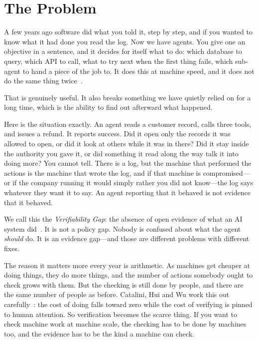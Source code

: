 \documentclass[11pt]{article}
\begin{document}
\clearpage

\section{The Problem}
\label{sec:intro}

A few years ago software did what you told it, step by step, and if you wanted
to know what it had done you read the log. Now we have agents. You give one an
objective in a sentence, and it decides for itself what to do: which database
to query, which API to call, what to try next when the first thing fails,
which sub-agent to hand a piece of the job to. It does this at machine speed,
and it does not do the same thing twice~\cite{paloalto2026,airia2026}.

That is genuinely useful. It also breaks something we have quietly relied on
for a long time, which is the ability to find out afterward what happened.

Here is the situation exactly. An agent reads a customer record, calls three
tools, and issues a refund. It reports success. Did it open only the records
it was allowed to open, or did it look at others while it was in there? Did it
stay inside the authority you gave it, or did something it read along the way
talk it into doing more? You cannot tell. There is a log, but the machine that
performed the actions is the machine that wrote the log, and if that machine
is compromised---or if the company running it would simply rather you did not
know---the log says whatever they want it to say. An agent reporting that it
behaved is not evidence that it behaved.

We call this the \emph{Verifiability Gap}: the absence of open evidence
of what an AI system did~\cite{pocspec}. It is not a policy gap. Nobody is
confused about what the agent \emph{should} do. It is an evidence gap---and
those are different problems with different fixes.

The reason it matters more every year is arithmetic. As machines get cheaper
at doing things, they do more things, and the number of actions somebody ought
to check grows with them. But the checking is still done by people, and there
are the same number of people as before. Catalini, Hui and Wu work this out
carefully~\cite{catalini2026}: the cost of doing falls toward zero while the
cost of verifying is pinned to human attention. So verification becomes the
scarce thing. If you want to check machine work at machine scale, the checking
has to be done by machines too, and the evidence has to be the kind a machine
can check.
\end{document}

